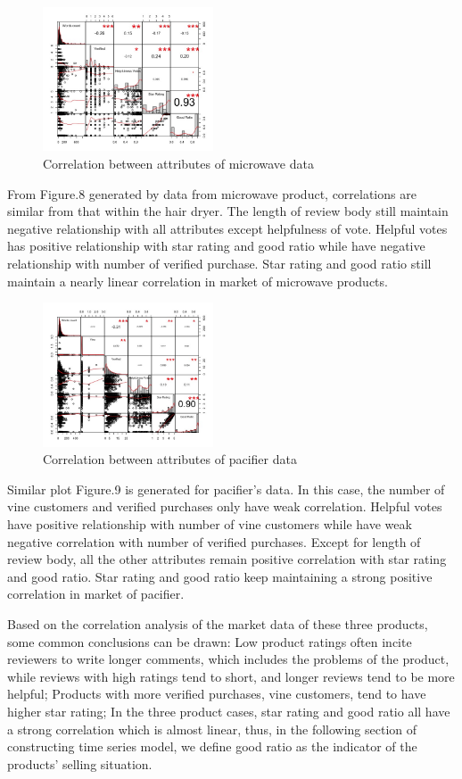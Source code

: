 \documentclass[12pt]{article}
\begin{document}
\begin{figure}[h]
\caption{Correlation between attributes of microwave data}
\centering
\includegraphics[width=0.45\textwidth]{mcorrelation1.jpeg}
\end{figure}
From Figure.8 generated by data from microwave product, correlations are similar from that within the hair dryer. The length of review body still maintain negative relationship with all attributes except helpfulness of vote. Helpful votes has positive relationship with star rating and good ratio while have negative relationship with number of verified purchase. Star rating and good ratio still maintain a nearly linear correlation in market of microwave products.

\begin{figure}[h]
\caption{Correlation between attributes of pacifier data}
\centering
\includegraphics[width=0.45\textwidth]{pcorrelation1.jpeg}
\end{figure}
Similar plot Figure.9 is generated for pacifier's data. In this case, the number of vine customers and verified purchases only have weak correlation. Helpful votes have positive relationship with number of vine customers while have weak negative correlation with number of verified purchases. Except for length of review body, all the other attributes remain positive correlation with star rating and good ratio. Star rating and good ratio keep maintaining a strong positive correlation in market of pacifier.

Based on the correlation analysis of the market data of these three products, some common conclusions can be drawn: Low product ratings often incite reviewers to write longer comments, which includes the problems of the product, while reviews with high ratings tend to short, and longer reviews tend to be more helpful; Products with more verified purchases, vine customers, tend to have higher star rating; In the three product cases, star rating and good ratio all have a strong correlation which is almost linear, thus, in the following section of constructing time series model, we define good ratio as the indicator of the products' selling situation.
\end{document}
